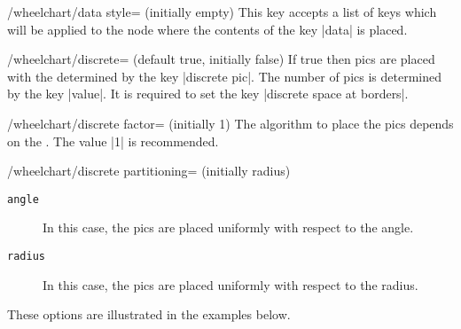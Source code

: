 \documentclass[a4paper,english,dvipsnames]{ltxdoc}
\begin{document}
\begin{stylekey}{/wheelchart/data style= (initially \normalfont empty)}
This key accepts a list of keys which will be applied to the node where the contents of the key |data| is placed.
\end{stylekey}
\begin{key}{/wheelchart/discrete= (default true, initially false)}
If true then \tikzname{} pics are placed with the  determined by the key |discrete pic|. The number of pics is determined by the key |value|. It is required to set the key |discrete space at borders|.
\end{key}
\begin{key}{/wheelchart/discrete factor= (initially 1)}
The algorithm to place the \tikzname{} pics depends on the . The value |1| is recommended.
\end{key}
\begin{key}{/wheelchart/discrete partitioning= (initially radius)}
\begin{description}
\item[\texttt{angle}] In this case, the \tikzname{} pics are placed uniformly with respect to the angle.
\item[\texttt{radius}] In this case, the \tikzname{} pics are placed uniformly with respect to the radius.
\end{description}
These options are illustrated in the examples below.
\begin{codeexample}[]
\end{codeexample}
\end{key}
\end{document}
